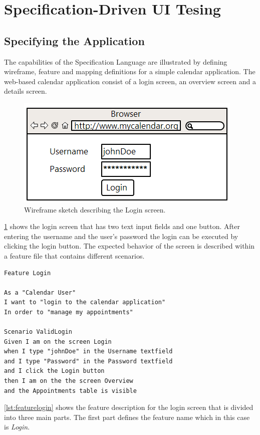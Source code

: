\documentclass{sig-alternate-05-2015}
\begin{document}
\section{Specification-Driven UI Tesing}\label{sec:SpecificationDrivenUITesting}
\subsection{Specifying the Application}\label{sec:SpecifyingTheApplication} 
The capabilities of the Specification Language are illustrated by defining wireframe, feature and mapping definitions for a simple calendar application.
The web-based calendar application consist of a login screen, an overview screen and a details screen.
\begin{figure}[h]
	\centering
	\includegraphics[width=0.8\linewidth]{Login.png}
	\caption{Wireframe sketch describing the Login screen.}
	\label{fig:login}
\end{figure}
\cref{fig:login} shows the login screen that has two text input fields and one button.
After entering the username and the user's password the login can be executed by clicking the login button.
The expected behavior of the screen is described within a feature file that contains different scenarios.
\begin{lstlisting}[captionpos=b, caption=Feature Description: Login Screen., label={lst:featurelogin}, language=dsl]
Feature Login

As a "Calendar User"
I want to "login to the calendar application"
In order to "manage my appointments"

Scenario ValidLogin
Given I am on the screen Login 
when I type "johnDoe" in the Username textfield 
and I type "Password" in the Password textfield 
and I click the Login button
then I am on the the screen Overview 
and the Appointments table is visible
\end{lstlisting}
\cref{lst:featurelogin} shows the feature description for the login screen that is divided into three main parts. 
The first part defines the feature name which in this case is \textit{Login}.
\end{document}
